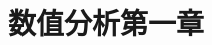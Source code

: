 \documentclass{ctexbeamer}
\title{数值分析第一章}
\theoremstyle{definition}
\begin{document}
\begin{frame}\frametitle{}
\titlepage
\end{frame}




\end{document}
